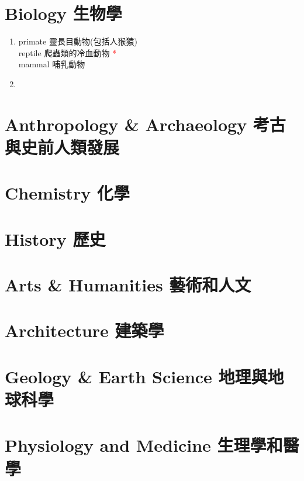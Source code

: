 \documentclass[twoside,b5paper]{book}
\begin{document}
  \chapter{Biology 生物學}
  \begin{enumerate}
    \item
      primate  靈長目動物(包括人猴猿)\\
      reptile  爬蟲類的冷血動物 \textcolor{red}{*}\\
      mammal  哺乳動物\\
    \item
  \end{enumerate}

  \chapter{Anthropology \& Archaeology 考古與史前人類發展}

  \chapter{Chemistry 化學}

  \chapter{History 歷史}

  \chapter{Arts \& Humanities 藝術和人文}

  \chapter{Architecture 建築學}

  \chapter{Geology \& Earth Science 地理與地球科學}

  \chapter{Physiology and Medicine 生理學和醫學}
\end{document}
